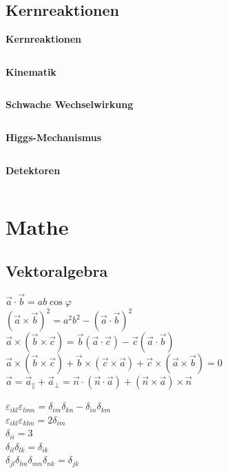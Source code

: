 \documentclass[12pt,a4paper, twoside]{article}
\renewcommand{\=}[1]{\stackrel{#1}{=}}
\theoremstyle{definition}
\theoremstyle{remark}
\newcommand{\concept}[2]{%
\noindent
\begin{framed}
\noindent\textbf{#1}
\par\begin{tabular}{p{0.9\linewidth}}
#2
\end{tabular}
\end{framed}
}
\begin{document}
\subsection{Kernreaktionen}

\concept{Kernreaktionen}{

}


\concept{Kinematik}{


}

\concept{Schwache Wechselwirkung}{

}

\concept{Higgs-Mechanismus}{

}

\concept{Detektoren}{

}



\newpage
\appendix
{}

\section{Mathe}


\subsection{Vektoralgebra}

\begin{center}
\begin{minipage}[t]{.49\linewidth}
\vspace{0pt}
$\vec{a} \cdot \vec{b} = ab\cos\varphi$\\
$(\vec{a} \times \vec{b})^2 = a^2b^2 - (\vec{a} \cdot \vec{b})^2$\\
$\vec{a} \times (\vec{b} \times \vec{c}) = \vec{b}(\vec{a} \cdot \vec{c}) - \vec{c}(\vec{a} \cdot \vec{b})$\\
$\vec a \times (\vec b \times \vec c) + \vec b \times (\vec c \times \vec a) + \vec c \times (\vec a \times \vec b) = 0$\\
$\vec{a} = \vec{a}_{\parallel} + \vec{a}_{\perp} = \vec{n} \cdot (\vec{n} \cdot \vec{a}) + (\vec{n} \times \vec{a}) \times \vec{n}$\\
\end{minipage}%
\begin{minipage}[t]{.49\linewidth}
\vspace{0pt}
$\varepsilon_{ikl} \varepsilon_{lmn} = \delta_{im} \delta_{kn} - \delta_{in} \delta_{km}$\\
$\varepsilon_{ikl} \varepsilon_{klm} = 2 \delta_{im}$\\
$\delta_{ii} = 3$\\
$\delta_{il} \delta_{lk} = \delta_{ik}$\\
$\delta_{jl}\delta_{lm}\delta_{mn}\delta_{nk} = \delta_{jk}$\\
\end{minipage}
\end{center}
\end{document}
